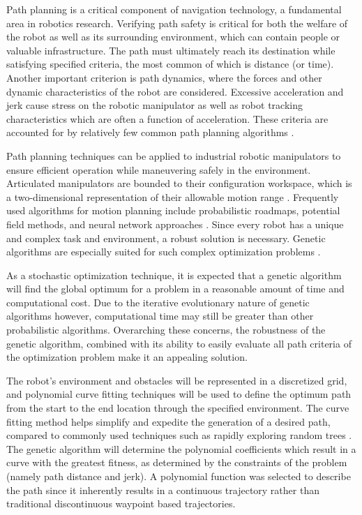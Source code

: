 Path planning is a critical component of navigation technology, a fundamental area in robotics research. Verifying path safety is critical for both the welfare of the robot as well as its surrounding environment, which can contain people or valuable infrastructure. The path must ultimately reach its destination while satisfying specified criteria, the most common of which is distance (or time). Another important criterion is path dynamics, where the forces and other dynamic characteristics of the robot are considered. Excessive acceleration and jerk cause stress on the robotic manipulator as well as robot tracking characteristics which are often a function of acceleration. These criteria are accounted for by relatively few common path planning algorithms \cite{elshamli04}.


Path planning techniques can be applied to industrial robotic manipulators to ensure efficient operation while maneuvering safely in the environment. Articulated manipulators are bounded to their configuration workspace, which is a two-dimensional representation of their allowable motion range \cite{kavraki96}. Frequently used algorithms for motion planning include probabilistic roadmaps, potential field methods, and neural network approaches \cite{sharir89,khosla88,rimon92,yang00}. Since every robot has a unique and complex task and environment, a robust solution is necessary. Genetic algorithms are especially suited for such complex optimization problems \cite{renner03}.

As a stochastic optimization technique, it is expected that a genetic algorithm will find the global optimum for a problem in a reasonable amount of time and computational cost. Due to the iterative evolutionary nature of genetic algorithms however, computational time may still be greater than other probabilistic algorithms. Overarching these concerns, the robustness of the genetic algorithm, combined with its ability to easily evaluate all path criteria of the optimization problem make it an appealing solution.

The robot's environment and obstacles will be represented in a discretized grid, and polynomial curve fitting techniques will be used to define the optimum path from the start to the end location through the specified environment. The curve fitting method helps simplify and expedite the generation of a desired path, compared to commonly used techniques such as rapidly exploring random trees \cite{rodriguez06}. The genetic algorithm will determine the polynomial coefficients which result in a curve with the greatest fitness, as determined by the constraints of the problem (namely path distance and jerk). A polynomial function was selected to describe the path since it inherently results in a continuous trajectory rather than traditional discontinuous waypoint based trajectories.

